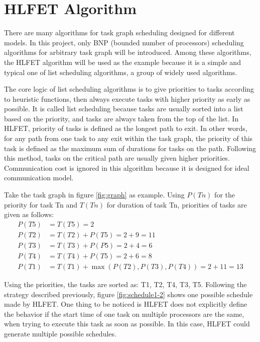 \documentclass[msc,deptreport, cs]{infthesis}
\begin{document}
\section{HLFET Algorithm}

There are many algorithms for task graph scheduling designed for different models. In this project, only BNP (bounded number of processors) scheduling algorithms for arbitrary task graph will be introduced. Among these algorithms, the HLFET algorithm \cite{adam1974comparison} will be used as the example because it is a simple and typical one of list scheduling algorithms, a group of widely used algorithms.

The core logic of list scheduling algorithms is to give priorities to tasks according to heuristic functions, then always execute tasks with higher priority as early as possible. It is called list scheduling because tasks are usually sorted into a list based on the priority, and tasks are always taken from the top of the list. In HLFET, priority of tasks is defined as the longest path to exit. In other words, for any path from one task to any exit within the task graph, the priority of this task is defined as the maximum sum of durations for tasks on the path. Following this method, tasks on the critical path are usually given higher priorities. Communication cost is ignored in this algorithm because it is designed for ideal communication model.

Take the task graph in figure \ref{fig:graph} as example. Using $P(Tn)$ for the priority for task Tn and $T(Tn)$ for duration of task Tn, priorities of tasks are given as follows:
\begin{align*}
P(T5) &= T(T5) = 2\\
P(T2) &= T(T2) + P(T5) = 2 + 9 = 11\\
P(T3) &= T(T3) + P(P5) = 2 + 4 = 6\\
P(T4) &= T(T4) + P(T5) = 2 + 6 = 8\\
P(T1) &= T(T1) + \max(P(T2), P(T3), P(T4)) = 2 + 11 = 13
\end{align*}

Using the priorities, the tasks are sorted as: T1, T2, T4, T3, T5. Following the strategy described previously, figure \ref{fig:schedule1-2} shows one possible schedule made by HLFET. One thing to be noticed is HLFET does not explicitly define the behavior if the start time of one task on multiple processors are the same, when trying to execute this task as soon as possible. In this case, HLFET could generate multiple possible schedules.
\end{document}
